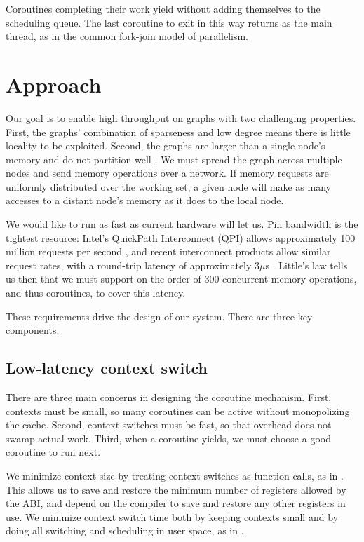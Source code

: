 \documentclass{acm_proc_article-sp}
\begin{document}

Coroutines completing their work yield without adding themselves to
the scheduling queue.  The last coroutine to exit in this way returns
as the main thread, as in the common  fork-join model of parallelism.


\section{Approach}

Our goal is to enable high throughput on graphs with two challenging
properties. First, the graphs' combination of sparseness and low
degree means there is little locality to be exploited. Second, the
graphs are larger than a single node's memory and do not partition
well . We must spread the graph across multiple nodes
and send memory operations over a network. If memory requests are
uniformly distributed over the working set, a given node will make as
many accesses to a distant node's memory as it does to the local node.

We would like to run as fast as current hardware will let us. Pin
bandwidth is the tightest resource: Intel's QuickPath Interconnect
(QPI) allows approximately 100 million requests per second
, and recent interconnect products allow similar request
rates, with a round-trip latency of approximately 3$\mu$s
. Little's law tells us then that we must support on the
order of 300 concurrent memory operations, and thus coroutines, to
cover this latency.

These requirements drive the design of our system. There are three key
components.

\subsection{Low-latency context switch}

There are three main concerns in designing the coroutine
mechanism. First, contexts must be small, so many coroutines can be
active without monopolizing the cache. Second, context switches must
be fast, so that overhead does not swamp actual work. Third, when a
coroutine yields, we must choose a good coroutine to run next.

We minimize context size by treating context switches as function
calls, as in \cite{charm}. This allows us to save and restore the
minimum number of registers allowed by the ABI, and depend on the
compiler to save and restore any other registers in use. We minimize
context switch time both by keeping contexts small and by doing all
switching and scheduling in user space, as in .
\end{document}

